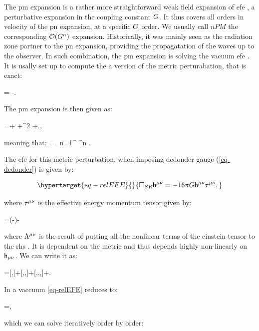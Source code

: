 \documentclass[
  10pt,
  a4paper,
  DIV=11,
  numbers=noendperiod,
  twoside]{scrreprt}
\let\[\relax \let\]\relax %
\DeclareRobustCommand{\[}{\begin{equation}}
\DeclareRobustCommand{\]}{\end{equation}}
\begin{document}
The \gls{pm} expansion is a rather more straightforward weak field
expansion of \gls{efe} , a perturbative expansion in the coupling
constant \(\grav\). It thus covers all orders in velocity of the
\gls{pn} expansion, at a specific \(\grav\) order. We usually call
\(nPM\) the corresponding \(\order[n]{\grav}\) expansion. Historically,
it was mainly seen as the radiation zone partner to the \gls{pn}
expansion, providing the propagatation of the waves up to the observer.
In such combination, the \gls{pm} expansion is solving the vacuum
\gls{efe} . It is usally set up to compute the a version of the metric
perturabation, that is exact:

\[\pertmet=\sqrt{-\metricTensor} \invmet-\invmink.\]

The \gls{pm} expansion is then given as:

\[
\sqrt{-\metricTensor} \invmet=\invmink+ \grav {}+\grav^2 +\ldots
\]

meaning that: \[
\invpertmet=\sum\limits_{n=1}^{\infty} \grav^n  .
\]

The \gls{efe} for this metric perturbation, when imposing dedonder gauge
(\ref{eq-dedonder}) is given by:

\begin{equation}\protect\hypertarget{eq-relEFE}{}{
\SRDA \invpertmet=-16 \pi \grav \invpertmet \relSEct ,
}\label{eq-relEFE}\end{equation}

where \(\relSEct\) is the effective energy momentum tensor given by:

\[
\relSEct=(-\metricTensor)\SEct -\inv{16 \pi \grav}\ct[\mu\nu]{\Lambda}
\]

where \(\ct[\mu\nu]{\Lambda}\) is the result of putting all the
nonlinear terms of the einstein tensor to the \gls{rhs} . It is
dependent on the metric and thus depends highly non-linearly on
\(\pertmet\). We can write it as:

\[
\ct[\mu\nu]{\Lambda}=[\pertTensor,\pertTensor]+[\pertTensor,\pertTensor,\pertTensor]+[\pertTensor,\pertTensor,\pertTensor,\pertTensor]+\order[5]{\pertTensor}.
\]

In a vaccuum \ref{eq-relEFE} reduces to:

\[
\SRDA \invpertmet=\ct[\mu\nu]{\Lambda},
\]

which we can solve iteratively order by order:
\end{document}
